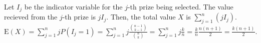 Let $I_{j}$ be the indicator variable for the $j$-th prize being selected. The
value recieved from the $j$-th prize is $jI_{j}$. Then, the total value
$X$ is $\sum_{j=1}^{n}(jI_{j})$. $\text{E}(X) = \sum_{j=1}^{n}jP(I_{j}=1) = \sum_
{j=1}^{n}j\frac{\binom{n-1}{k-1}}{\binom{n}{k}} =  \sum_
{j=1}^{n}j\frac{k}{n} = \frac{k}{n}\frac{n(n+1)}{2} = \frac{k(n+1)}{2}.$
